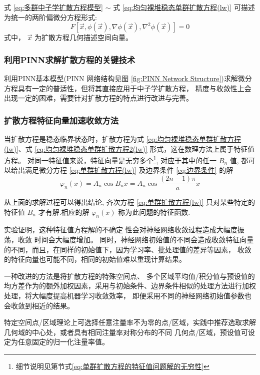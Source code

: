 \documentclass{Sichuan Normal University}
\begin{document}
式 \eqref{eq:多群中子学扩散方程模型}  $\sim$ 式 \eqref{eq:均匀裸堆稳态单群扩散方程(lw)} 可描述为统一的两阶偏微分方程形式:
\begin{equation}
F\left[\vec{x}, \phi(\vec{x}), \nabla \phi(\vec{x}), \nabla^2 \phi(\vec{x})\right]=0
\end{equation}
式中， $\vec{x}$ 为扩散方程几何描述空间向量。

\subsubsection{利用PINN求解扩散方程的关键技术}
利用PINN基本模型(PINN 网络结构见图 \ref{fig:PINN Network Structure})求解微分方程具有一定的普适性，但将其直接应用于中子学扩散方程， 精度与收敛性上会出现一定的困难，需要针对扩散方程的特点进行改进与完善。
\subsubsection{扩散方程特征向量加速收敛方法}\label{sec:扩散方程特征向量加速收敛方法}
当扩散方程是稳态临界状态时，扩散方程为式 \eqref{eq:均匀裸堆稳态单群扩散方程(lw)}、式 \eqref{eq:均匀裸堆稳态单群扩散方程2(lw)} 形式，这在数理方法上属于特征值方程。
对同一特征值来说，特征向量是无穷多个\footnote{细节说明见第\label{sec:均匀裸堆的单群扩散方程的解}节式\eqref{eq:单群扩散方程的特征值问题解的无穷性}}, 对应于其中的任一 $B_n$ 值, 都可以给出满足微分方程 \eqref{eq:单群扩散方程(lw)} 及边界条件 \eqref{eq:边界条件} 的解
\begin{equation}
\varphi_n(x)=A_n \cos B_n x=A_n \cos \frac{(2 n-1) \pi}{a} x
\label{eq:单群扩散方程的特征值问题解的无穷性}
\end{equation}

从上面的求解过程可以得出结论, 齐次方程 \eqref{eq:单群扩散方程(lw)} 只对某些特定的特征值 $B_n$ 才有解.相应的解 $\varphi_n(x)$ 称为此问题的特征函数.

实验证明，这种特征值方程解的不确定 性会对神经网络收敛过程造成大幅度振荡，收敛 时间会大幅度增加。
同时，神经网络初始值的不同会造成收敛特征向量的不同，而且，在同样的初始值下，因为学习率、批处理值的差异等因素， 收敛的特征向量也可能不同，相同的初始值难以重现计算结果。

一种改进的方法是将扩散方程的特殊空间点、 多个区域平均值/积分值与预设值的均方差作为的额外加权因素，采用与初始条件、边界条件相似的处理方法进行加权处理，将大幅度提高机器学习收敛效率，
即便采用不同的神经网络初始值参数也会收敛到相近的结果。 

特定空间点/区域理论上可选择任意注量率不为零的点/区域，实践中推荐选取求解几何域的中心处，或者具有相同注量率对称分布的不同 几何点/区域，预设值可设定为任意固定的归一化注量率值。 
\end{document}

